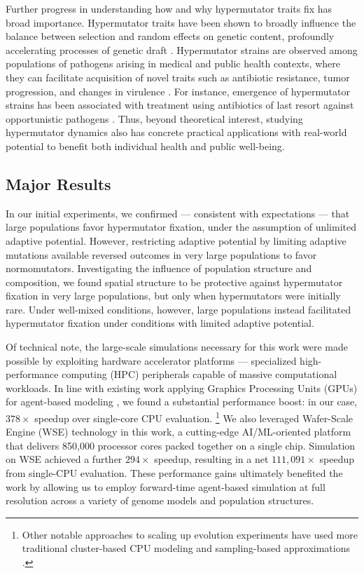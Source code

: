 Further progress in understanding how and why hypermutator traits fix has broad importance.
Hypermutator traits have been shown to broadly influence the balance between selection and random effects on genetic content, profoundly accelerating processes of genetic draft \citep{couce2017mutator}.
Hypermutator strains are observed among populations of pathogens arising in medical and public health contexts, where they can facilitate acquisition of novel traits such as antibiotic resistance, tumor progression, and changes in virulence \citep{eliopoulos2003hypermutation,jolivetgougeon2011bacterial,stern2016viral,schlesner2015hypermutation,hammerstrom2015acinetobacter,perron2010hypermutability}.
For instance, emergence of hypermutator strains has been associated with treatment using antibiotics of last resort against opportunistic pathogens \citep{mehta2019essential}.
Thus, beyond theoretical interest, studying hypermutator dynamics also has concrete practical applications with real-world potential to benefit both individual health and public well-being.

\subsection{Major Results}

In our initial experiments, we confirmed --- consistent with expectations --- that large populations favor hypermutator fixation, under the assumption of unlimited adaptive potential.
However, restricting adaptive potential by limiting adaptive mutations available reversed outcomes in very large populations to favor normomutators.
Investigating the influence of population structure and composition, we found spatial structure to be protective against hypermutator fixation in very large populations, but only when hypermutators were initially rare.
Under well-mixed conditions, however, large populations instead facilitated hypermutator fixation under conditions with limited adaptive potential.

Of technical note, the large-scale simulations necessary for this work were made possible by exploiting hardware accelerator platforms --- specialized high-performance computing (HPC) peripherals capable of massive computational workloads.
In line with existing work applying Graphics Processing Units (GPUs) for agent-based modeling \citep{turpin2021xaevol,kosiachenko2019mass,perumalla2009switching,heinemann2007artificial,richmond2023flame}, we found a substantial performance boost: in our case, $378\times$ speedup over single-core CPU evaluation.
\footnote{%
Other notable approaches to scaling up evolution experiments have used more traditional cluster-based CPU modeling \citep{moreno2022best,collier2015large,ray1995proposal,turpin2020paevol} and sampling-based approximations \citep{taddei1997role}.
}
We also leveraged Wafer-Scale Engine (WSE) technology in this work, a cutting-edge AI/ML-oriented platform that delivers 850,000 processor cores packed together on a single chip.
Simulation on WSE achieved a further $294\times$ speedup, resulting in a net $111{,}091\times$ speedup from single-CPU evaluation.
These performance gains ultimately benefited the work by allowing us to employ forward-time agent-based simulation at full resolution across a variety of genome models and population structures.
